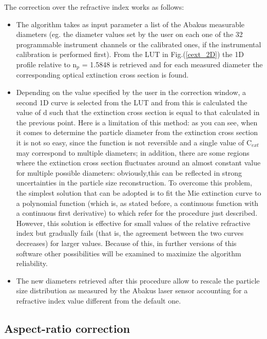 \documentclass[a4paper, 11pt]{report}
\begin{document}
\newline
The correction over the refractive index works as follows:
\begin{itemize}
\item The algorithm takes as input parameter a list of the Abakus measurable diameters (eg. the diameter values set by the user on each one of the 32 programmable instrument channels or the calibrated ones, if the instrumental calibration is performed first). From the LUT in Fig.(\ref{cext_2D}) the 1D profile relative to n$_{p}$ = 1.5848 is retrieved and for each measured diameter the corresponding optical extinction cross section is found.
\item Depending on the value specified by the user in the correction window, a second 1D curve is selected from the LUT and from this is calculated the value of d such that the extinction cross section is equal to that calculated in the previous point.
Here is a limitation of this method: as you can see, when it comes to determine the particle diameter from the extinction cross section it is not so easy, since the function is not reversible and a single value of C$_{ext}$ may correspond to multiple diameters; in addition, there are some regions where the extinction cross section fluctuates around an almost constant value for multiple possible diameters: obviously,this can be reflected in strong uncertainties in the particle size reconstruction.
To overcome this problem, the simplest solution that can be adopted is to fit the Mie extinction curve to a polynomial function (which is, as stated before, a continuous function with a continuous first derivative) to which refer for the procedure just described. However, this solution is effective for small values of the relative refractive index but gradually fails (that is, the agreement between the two curves decreases) for larger values. Because of this, in further versions of this software other possibilities will be examined to maximize the algorithm reliability.
\item The new diameters retrieved after this procedure allow to rescale the particle size distribution as measured by the Abakus laser sensor accounting for a refractive index value different from the default one.
\end{itemize}


\subsection{Aspect-ratio correction}
\label{AR_calibration_subsection}
\end{document}

